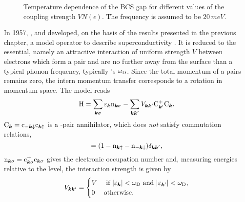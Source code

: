 \begin{figure}
    \small
    
    \caption{
        Temperature dependence of the BCS gap for different values of the
        coupling strength $V N(\epsilon)$. The  frequency is assumed
        to be $20 \, \unit{meV}$.}
    \label{BCS gap}
\end{figure}
%
In 1957, ,  and  developed, on the
basis of the results presented in the previous chapter, a model 
operator to describe superconductivity \cites {BardeenCooperSchrieffer57a}
{BardeenCooperSchrieffer57b}. It is reduced to the essential, namely an
attractive interaction of uniform strength $V$ between electrons which form a
 pair and are no further away from the  surface than a
typical phonon frequency, typically 's $\omega \sb{\text{D}}$. Since the
total momentum of a  pairs remains zero, the intern momentum
transfer corresponds to a rotation in momentum space. The model reads
%
\begin{equation*}
    \mathrm H = \sum_{\boldsymbol k \sigma} \varepsilon_{\boldsymbol k} \mathrm n_{\boldsymbol k \sigma}
    - \sum_{\boldsymbol k \boldsymbol k'} V_{\boldsymbol k \boldsymbol k'} \mathrm C_{\boldsymbol k'}^+ \mathrm C_{\boldsymbol k}.
\end{equation*}
%
$\mathrm C_{\boldsymbol k} = \mathrm c_{-\boldsymbol k \downarrow} \mathrm c_{\boldsymbol k \uparrow}$ is a
-pair annihilator, which does \emph{not} satisfy 
commutation relations,
%
\begin{equation*}
    [\op C_{\vec k}, \op C_{\vec k'}^+]
    = (1 - \op n_{\vec k \up} - \op n_{-\vec k \down}) \delta_{\vec k \vec k'},
\end{equation*}
%
$\mathrm n_{\boldsymbol k \sigma} = \mathrm c_{\boldsymbol k \sigma}^+ \mathrm c_{\boldsymbol k \sigma}$ gives
the electronic occupation number and, measuring energies relative to the
 level, the interaction strength is given by
%
\begin{equation*}
    V_{\boldsymbol k \boldsymbol k'} = \begin{cases}
        V & \text{
             if $|\varepsilon_{\boldsymbol k }| < \omega \sb{\text{D}}$
            and $|\varepsilon_{\boldsymbol k'}| < \omega \sb{\text{D}}$,} \\
        0 & \text{otherwise.}
    \end{cases}
\end{equation*}

